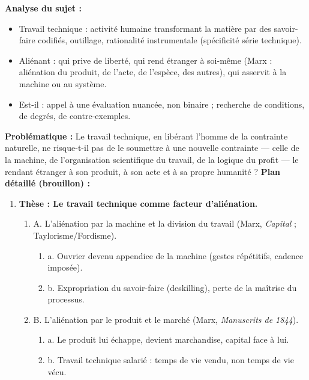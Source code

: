 \documentclass[11pt]{article}
\newcommand{\cle}[1]{{\popxbold\color{popdark}#1}}
\begin{document}
\begin{exemplebox}
\textbf{Analyse du sujet :}
\begin{itemize}
    \item \cle{Travail technique} : activit\'e humaine transformant la mati\`ere par des savoir-faire codifi\'es, outillage, rationalit\'e instrumentale (sp\'ecificit\'e s\'erie technique).
    \item \cle{Ali\'enant} : qui prive de libert\'e, qui rend \'etranger \`a soi-m\^eme (Marx : ali\'enation du produit, de l'acte, de l'esp\`ece, des autres), qui asservit \`a la machine ou au syst\`eme.
    \item \cle{Est-il} : appel \`a une \'evaluation nuanc\'ee, non binaire ; recherche de conditions, de degr\'es, de contre-exemples.
\end{itemize}
\textbf{Probl\'ematique :} Le travail technique, en lib\'erant l'homme de la contrainte naturelle, ne risque-t-il pas de le soumettre \`a une nouvelle contrainte --- celle de la machine, de l'organisation scientifique du travail, de la logique du profit --- le rendant \'etranger \`a son produit, \`a son acte et \`a sa propre humanit\'e ?
\textbf{Plan d\'etaill\'e (brouillon) :}
\begin{enumerate}
    \item \textbf{Th\`ese : Le travail technique comme facteur d'ali\'enation.}
        \begin{enumerate}
            \item A. L'ali\'enation par la machine et la division du travail (Marx, \emph{Capital} ; Taylorisme/Fordisme).
                \begin{enumerate}
                    \item a. Ouvrier devenu \guillemotleft appendice de la machine \guillemotright (gestes r\'ep\'etitifs, cadence impos\'ee).
                    \item b. Expropriation du savoir-faire (deskilling), perte de la ma\^itrise du processus.
                \end{enumerate}
            \item B. L'ali\'enation par le produit et le march\'e (Marx, \emph{Manuscrits de 1844}).
                \begin{enumerate}
                    \item a. Le produit lui \'echappe, devient marchandise, capital face \`a lui.
                    \item b. Travail technique salari\'e : temps de vie vendu, non temps de vie v\'ecu.

\end{enumerate}
\end{enumerate}
\end{enumerate}
\end{exemplebox}
\end{document}

